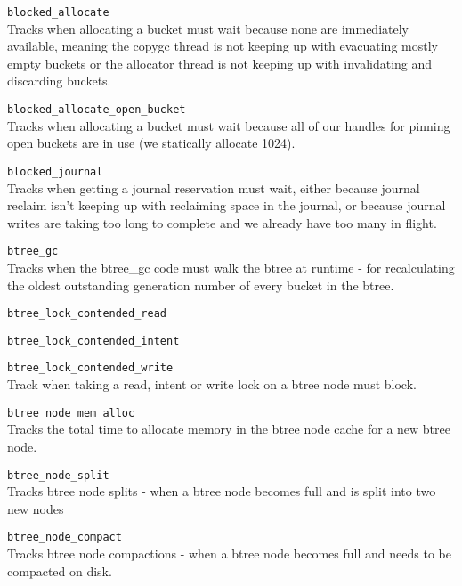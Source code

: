 \documentclass{article}
\begin{document}
\begin{description}
	\item \texttt{blocked\_allocate} \\
		Tracks when allocating a bucket must wait because none are
		immediately available, meaning the copygc thread is not keeping
		up with evacuating mostly empty buckets or the allocator thread
		is not keeping up with invalidating and discarding buckets.

	\item \texttt{blocked\_allocate\_open\_bucket} \\
		Tracks when allocating a bucket must wait because all of our
		handles for pinning open buckets are in use (we statically
		allocate 1024).

	\item \texttt{blocked\_journal} \\
		Tracks when getting a journal reservation must wait, either
		because journal reclaim isn't keeping up with reclaiming space
		in the journal, or because journal writes are taking too long to
		complete and we already have too many in flight.

	\item \texttt{btree\_gc} \\
		Tracks when the btree\_gc code must walk the btree at runtime -
		for recalculating the oldest outstanding generation number of
		every bucket in the btree.

	\item \texttt{btree\_lock\_contended\_read}
	\item \texttt{btree\_lock\_contended\_intent}
	\item \texttt{btree\_lock\_contended\_write} \\
		Track when taking a read, intent or write lock on a btree node
		must block.

	\item \texttt{btree\_node\_mem\_alloc} \\
		Tracks the total time to allocate memory in the btree node cache
		for a new btree node.

	\item \texttt{btree\_node\_split} \\
		Tracks btree node splits - when a btree node becomes full and is
		split into two new nodes

	\item \texttt{btree\_node\_compact} \\
		Tracks btree node compactions - when a btree node becomes full
		and needs to be compacted on disk.


\end{description}
\end{document}
